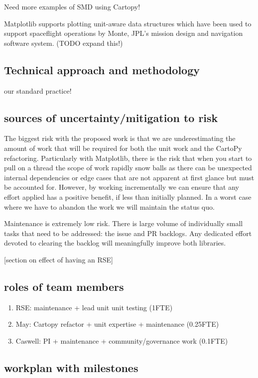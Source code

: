 \documentclass[12pt]{article}
\numberwithin{page}{section}
\begin{document}
Need more examples of SMD using Cartopy!

Matplotlib supports plotting unit-aware data structures which have
been used to support spaceflight operations by Monte, JPL's mission
design and navigation software system. (TODO expand this!)

\subsection{Technical approach and methodology}

our standard practice!

\subsection{sources of uncertainty/mitigation to risk}

The biggest risk with the proposed work is that we are underestimating
the amount of work that will be required for both the unit work and
the CartoPy refactoring.  Particularly with Matplotlib, there is the
risk that when you start to pull on a thread the scope of work rapidly
snow balls as there can be unexpected internal dependencies or edge
cases that are not apparent at first glance but must be accounted for.
However, by working incrementally we can ensure that any effort
applied has a positive benefit, if less than initially planned.  In a
worst case where we have to abandon the work we will maintain the
status quo.

Maintenance is extremely low risk.  There is large volume of
individually small tasks that need to be addressed: the issue and PR backlogs.
Any dedicated effort devoted to clearing the backlog will meaningfully improve
both libraries.

[section on effect of having an RSE]

\subsection{roles of team members}
\begin{enumerate}
\item RSE: maintenance + lead unit unit testing (1FTE)
\item May: Cartopy refactor + unit expertise + maintenance (0.25FTE)
\item Caswell: PI + maintenance + community/governance work (0.1FTE)
\end{enumerate}

\subsection{workplan with milestones}
\end{document}
